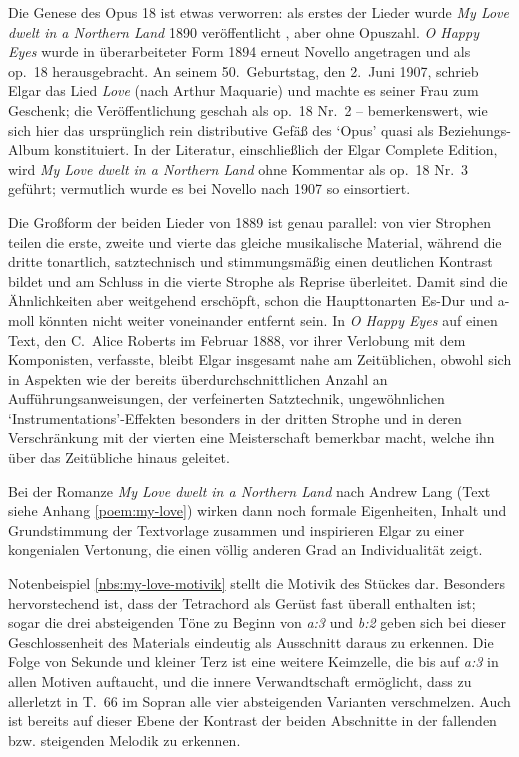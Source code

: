 \documentclass[a4paper,11pt,open=any]{scrbook}
\begin{document}
Die Genese des Opus 18 ist etwas verworren: als erstes der Lieder
wurde \textit{My Love dwelt in a Northern Land} 1890 veröffentlicht
\cite[S.~143]{moore}, aber ohne Opuszahl.  \textit{O Happy Eyes} wurde
in überarbeiteter Form 1894 erneut Novello angetragen und als op.~18
herausgebracht.  An seinem 50.~Geburtstag, den 2.~Juni 1907, schrieb Elgar
das Lied \textit{Love} (nach Arthur Maquarie) und machte es seiner Frau
zum Geschenk; die Veröffentlichung geschah als op.~18 Nr.~2 – bemerkenswert,
wie sich hier das ursprünglich rein distributive Gefäß des \enquote*{Opus}
quasi als Beziehungs-Album konstituiert.  In der Literatur, einschließlich
der Elgar Complete Edition, wird \textit{My Love dwelt in a Northern Land}
ohne Kommentar als op.~18 Nr.~3 geführt; vermutlich wurde es bei Novello
nach 1907 so einsortiert.

Die Großform der beiden Lieder von 1889 ist genau parallel: von vier
Strophen teilen die erste, zweite und vierte das gleiche musikalische
Material, während die dritte tonartlich, satztechnisch und stimmungsmäßig
einen deutlichen Kontrast bildet und am Schluss in die vierte Strophe als
Reprise überleitet.  Damit sind die Ähnlichkeiten aber weitgehend erschöpft,
schon die Haupttonarten Es-Dur und a-moll könnten nicht weiter voneinander
entfernt sein.  In \textit{O Happy Eyes} auf einen Text, den C.~Alice
Roberts im Februar 1888, vor ihrer Verlobung mit dem Komponisten, verfasste,
bleibt Elgar insgesamt nahe am Zeitüblichen, obwohl sich in Aspekten wie der
bereits überdurchschnittlichen Anzahl an Aufführungsanweisungen, der
verfeinerten Satztechnik, ungewöhnlichen \enquote*{Instrumentations}-Effekten
besonders in der dritten Strophe und in deren Verschränkung mit der vierten
eine Meisterschaft bemerkbar macht, welche ihn über das Zeitübliche hinaus
geleitet.

Bei der Romanze \textit{My Love dwelt in a Northern Land} nach Andrew Lang
(Text siehe Anhang \vref{poem:my-love}) wirken dann noch formale Eigenheiten,
Inhalt und Grundstimmung der Textvorlage zusammen und inspirieren Elgar zu
einer kongenialen Vertonung, die einen völlig anderen Grad an Individualität
zeigt.

Notenbeispiel \vref {nbs:my-love-motivik} stellt die Motivik des Stückes
dar.  Besonders hervorstechend ist, dass der Tetrachord als Gerüst fast
überall enthalten ist; sogar die drei absteigenden Töne zu Beginn von
\textit{a:3} und \textit{b:2} geben sich bei dieser Geschlossenheit des
Materials eindeutig als Ausschnitt daraus zu erkennen.  Die Folge von
Sekunde und kleiner Terz ist eine weitere Keimzelle, die bis auf \textit{a:3}
in allen Motiven auftaucht, und die innere Verwandtschaft ermöglicht, dass
zu allerletzt in T.~66 im Sopran alle vier absteigenden Varianten
verschmelzen.  Auch ist bereits auf dieser Ebene der Kontrast der beiden
Abschnitte in der fallenden bzw. steigenden Melodik zu erkennen.
\end{document}
